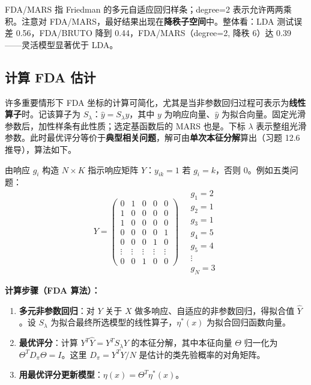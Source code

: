 \begin{remark}[表 12.3 的解读]
FDA/MARS 指 Friedman 的多元自适应回归样条；degree=2 表示允许两两乘积。注意对 FDA/MARS，最好结果出现在\textbf{降秩子空间}中。整体看：LDA 测试误差 0.56，FDA/BRUTO 降到 0.44，FDA/MARS（degree=2, 降秩 6）达 0.39——灵活模型显著优于 LDA。
\end{remark}

\subsection{计算 FDA 估计}

许多重要情形下 FDA 坐标的计算可简化，尤其是当非参数回归过程可表示为\textbf{线性算子}时。记该算子为 $S_\lambda$：$\hat y = S_\lambda y$，其中 $y$ 为响应向量、$\hat y$ 为拟合向量。固定光滑参数后，加性样条有此性质；选定基函数后的 MARS 也是。下标 $\lambda$ 表示整组光滑参数。此时最优评分等价于\textbf{典型相关问题}，解可由\textbf{单次本征分解}算出（习题 12.6 推导），算法如下。

由响应 $g_i$ 构造 $N\times K$ 指示响应矩阵 $Y$：$y_{ik}=1$ 若 $g_i=k$，否则 0。例如五类问题：
\begin{equation}
Y = \begin{pmatrix}
0 & 1 & 0 & 0 & 0\\
1 & 0 & 0 & 0 & 0\\
1 & 0 & 0 & 0 & 0\\
0 & 0 & 0 & 0 & 1\\
0 & 0 & 0 & 1 & 0\\
\vdots & \vdots & \vdots & \vdots & \vdots\\
0 & 0 & 1 & 0 & 0
\end{pmatrix} \quad
\begin{array}{l}
g_1=2\\ g_2=1\\ g_3=1\\ g_4=5\\ g_5=4\\ \vdots\\ g_N=3
\end{array}
\end{equation}

\textbf{计算步骤（FDA 算法）：}

\begin{enumerate}
\item \textbf{多元非参数回归}：对 $Y$ 关于 $X$ 做多响应、自适应的非参数回归，得拟合值 $\hat Y$。设 $S_\lambda$ 为拟合最终所选模型的线性算子，$\eta^*(x)$ 为拟合回归函数向量。
\item \textbf{最优评分}：计算 $Y^T\hat Y = Y^T S_\lambda Y$ 的本征分解，其中本征向量 $\Theta$ 归一化为 $\Theta^T D_\pi \Theta = I$。这里 $D_\pi = Y^T Y/N$ 是估计的类先验概率的对角矩阵。
\item \textbf{用最优评分更新模型}：$\eta(x) = \Theta^T \eta^*(x)$。
\end{enumerate}

